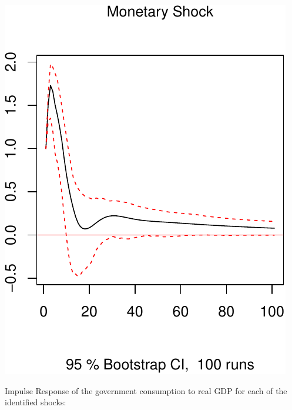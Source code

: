 \documentclass[11pt,preprint, authoryear]{elsarticle}
\numberwithin{equation}{section}
\numberwithin{figure}{section}
\numberwithin{table}{section}
\begin{document}
\includegraphics{TS_proj_files/figure-latex/unnamed-chunk-40-3.pdf}

\newpage

Impulse Response of the government consumption to real GDP for each of
the identified shocks:
\end{document}
